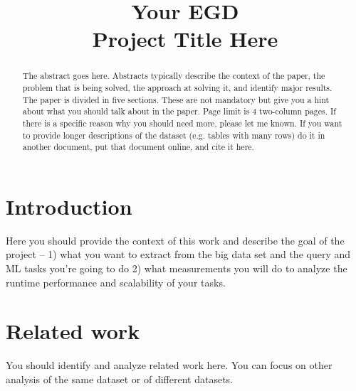 \documentclass[conference]{IEEEtran}
\begin{document}
\title{Your EGD \\ Project Title Here}


\author{
\and
{}
}


\maketitle

\begin{abstract}
The abstract goes here. Abstracts typically describe the context of the paper, the problem that is being solved, the approach at solving it, and identify major results.  The paper is divided in five sections. These are not mandatory but give you a hint about what you should talk about in the paper. Page limit is 4 two-column pages. If there is a specific reason why you should need more, please let me known. If you want to provide longer descriptions of the dataset (e.g.  tables with many rows) do it in another document, put that document online, and cite it here. 


\end{abstract}



\section{Introduction}

Here you should provide the context of this work and describe the goal of the project -- 1) what you want to extract from the big data set and the query and ML tasks you're going to do 2) what measurements you will do to analyze the runtime performance and scalability of your  tasks.

\section{Related work}
You should identify and analyze related work here.  You can focus on other analysis of the same dataset or of different datasets. 
\end{document}
